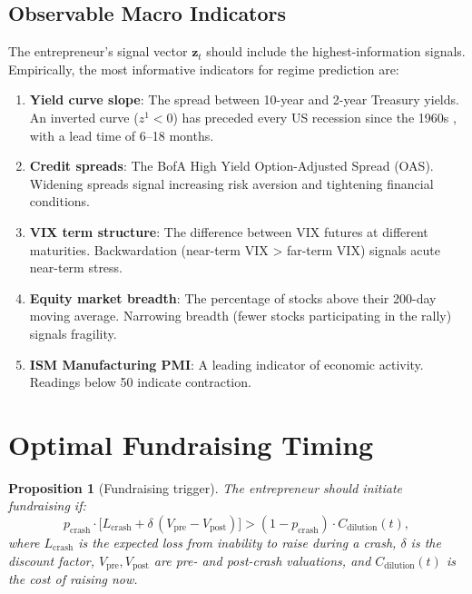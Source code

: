 \documentclass[12pt,a4paper,oneside]{book}
\newtheorem{proposition}[theorem]{Proposition}
\theoremstyle{definition}
\theoremstyle{remark}
\begin{document}
\subsection{Observable Macro Indicators}

The entrepreneur's signal vector $\mathbf{z}_t$ should include the
highest-information signals. Empirically, the most informative indicators for
regime prediction are:

\begin{enumerate}[nosep]
  \item \textbf{Yield curve slope}: The spread between 10-year and 2-year Treasury
    yields. An inverted curve ($z^1 < 0$) has preceded every US recession since the
    1960s \citep{EstrellaMishkin1998}, with a lead time of 6--18 months.
  \item \textbf{Credit spreads}: The BofA High Yield Option-Adjusted Spread (OAS).
    Widening spreads signal increasing risk aversion and tightening financial conditions.
  \item \textbf{VIX term structure}: The difference between VIX futures at different
    maturities. Backwardation (near-term VIX > far-term VIX) signals acute near-term
    stress.
  \item \textbf{Equity market breadth}: The percentage of stocks above their 200-day
    moving average. Narrowing breadth (fewer stocks participating in the rally) signals
    fragility.
  \item \textbf{ISM Manufacturing PMI}: A leading indicator of economic activity.
    Readings below 50 indicate contraction.
\end{enumerate}

\section{Optimal Fundraising Timing}

\begin{proposition}[Fundraising trigger]\label{prop:fundraise}
The entrepreneur should initiate fundraising if:
\begin{equation}\label{eq:fundraise_trigger}
  p_{\text{crash}} \cdot \bigl[L_{\text{crash}} + \delta\,(V_{\text{pre}} -
    V_{\text{post}})\bigr]
  > (1-p_{\text{crash}}) \cdot C_{\text{dilution}}(t),
\end{equation}
where $L_{\text{crash}}$ is the expected loss from inability to raise during a crash,
$\delta$ is the discount factor, $V_{\text{pre}}, V_{\text{post}}$ are pre- and
post-crash valuations, and $C_{\text{dilution}}(t)$ is the cost of raising now.
\end{proposition}
\end{document}
